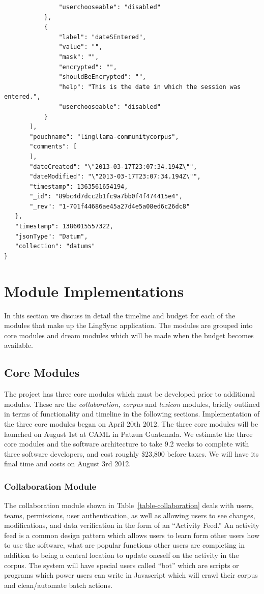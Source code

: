 \documentclass[12pt]{article}
\begin{document}
\begin{verbatim}
               "userchooseable": "disabled"
           },
           {
               "label": "dateSEntered",
               "value": "",
               "mask": "",
               "encrypted": "",
               "shouldBeEncrypted": "",
               "help": "This is the date in which the session was entered.",
               "userchooseable": "disabled"
           }
       ],
       "pouchname": "lingllama-communitycorpus",
       "comments": [
       ],
       "dateCreated": "\"2013-03-17T23:07:34.194Z\"",
       "dateModified": "\"2013-03-17T23:07:34.194Z\"",
       "timestamp": 1363561654194,
       "_id": "89bc4d7dcc2b1fc9a7bb0f4f474415e4",
       "_rev": "1-701f44686ae45a27d4e5a08ed6c26dc8"
   },
   "timestamp": 1386015557322,
   "jsonType": "Datum",
   "collection": "datums"
}
\end{verbatim}


\section{Module Implementations}

In this section we discuss in detail the timeline and budget for each of the modules that make up the LingSync application. The modules are grouped into core modules and dream modules which will be made when the budget becomes available. 

\label{sec:modules}
\subsection{Core Modules}

The project has three core modules which must be developed prior to additional modules. These are the {\it collaboration, corpus} and {\it lexicon} modules, briefly outlined in terms of functionality and timeline in the following sections.  Implementation of the three core modules began on April 20th 2012. The three core modules will be launched on August 1st at CAML in Patzun Guatemala. We estimate the three core modules and the software architecture to take 9.2 weeks to complete with three software developers,  and cost roughly \$23,800 before taxes. We will have its final time and costs on August 3rd 2012.


\newpage
\subsubsection{Collaboration Module}
The collaboration module shown in Table~\ref{table-collaboration}  deals with users, teams, permissions, user authentication,  as well as allowing users to see changes, modifications, and data verification in the form of an ``Activity Feed.'' An activity feed is a common design pattern which allows users to learn form other users how to use the software, what are popular functions other users are completing in addition to being a central location to update oneself on the activity in the corpus. The system will have special users called ``bot'' which are scripts or programs which power users can write in Javascript which will crawl their corpus and clean/automate batch actions.
\end{document}
